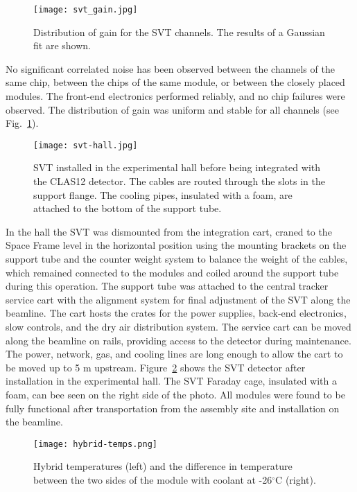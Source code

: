 \begin{figure}[hbt] 
\centering 
\texttt{[image: svt\_gain.jpg]}
\caption{Distribution of gain for the SVT channels. The results of a Gaussian fit are shown.}
\label{fig:svt_gain}
\end{figure}

No significant correlated noise has been observed between the channels of the same chip, between the chips of the same module, or between the closely placed modules. The front-end electronics performed reliably, and no chip failures were observed. The distribution of gain was uniform and stable for all channels (see Fig.~\ref{fig:svt_gain}). 
 
\begin{figure}[hbt] 
\centering 
\texttt{[image: svt-hall.jpg]}
\caption{SVT installed in the experimental hall before being integrated with the CLAS12 detector. The cables are routed through the slots in the support flange. The cooling pipes, insulated with a foam, are attached to the bottom of the support tube.}
\label{fig:svt-hall}
\end{figure}

In the hall the SVT was dismounted from the integration cart, craned to the Space Frame level in the horizontal position using the mounting brackets on the support tube and the counter weight system to balance the weight of the cables, which remained connected to the modules and coiled around the support tube during this operation. The support tube was attached to the central tracker service cart with the alignment system for final adjustment of the SVT along the beamline. The cart hosts the crates for the power supplies, back-end electronics, slow controls, and the dry air distribution system. The service cart can be moved along the beamline on rails, providing access to the detector during maintenance. The power, network, gas, and cooling lines are long enough to allow the cart to be moved up to 5 m upstream. Figure~\ref{fig:svt-hall} shows the SVT detector after installation in the experimental hall. The SVT Faraday cage, insulated with a foam, can bee seen on the right side of the photo. All modules were found to be fully functional after transportation from the assembly site and installation on the beamline. 

\begin{figure}[hbt] 
\centering 
\texttt{[image: hybrid-temps.png]}
\caption{Hybrid temperatures (left) and the difference in temperature between the two sides of the module with coolant at -26$^\circ$C (right).}
\label{fig:hybrid-temps}
\end{figure}

